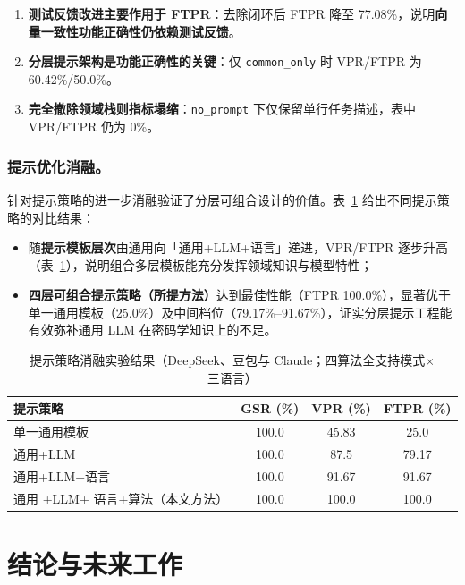 \documentclass[runningheads]{llncs}
\begin{document}
\begin{enumerate}[leftmargin=1.2em, labelsep=0.4em]
  \item \textbf{测试反馈改进主要作用于 FTPR}：去除闭环后 FTPR 降至 77.08\%，说明\textbf{向量一致性功能正确性仍依赖测试反馈}。
  \item \textbf{分层提示架构是功能正确性的关键}：仅 \texttt{common\_only} 时 VPR/FTPR 为 60.42\%/50.0\%。
  \item \textbf{完全撤除领域栈则指标塌缩}：\texttt{no\_prompt} 下仅保留单行任务描述，表中 VPR/FTPR 仍为 0\%。
\end{enumerate}


\subsubsection{提示优化消融。}
针对提示策略的进一步消融验证了分层可组合设计的价值。表~\ref{tab:ablation_prompt} 给出不同提示策略的对比结果：
\begin{itemize}[leftmargin=1.2em, labelsep=0.4em]
  \item 随\textbf{提示模板层次}由通用向「通用+LLM+语言」递进，VPR/FTPR 逐步升高（表~\ref{tab:ablation_prompt}），说明组合多层模板能充分发挥领域知识与模型特性；
  \item \textbf{四层可组合提示策略（所提方法）}达到最佳性能（FTPR 100.0\%），显著优于单一通用模板（25.0\%）及中间档位（79.17\%--91.67\%），证实分层提示工程能有效弥补通用 LLM 在密码学知识上的不足。
\end{itemize}

\begin{table}[H]
  \centering
  \caption{提示策略消融实验结果（DeepSeek、豆包与 Claude；四算法全支持模式$\times$三语言）}
  \label{tab:ablation_prompt}
  \setlength{\tabcolsep}{4pt}
  \begin{tabular}{l c c c}
    \toprule
    提示策略               & GSR (\%) & VPR (\%) & FTPR (\%) \\
    \midrule
    单一通用模板         & 100.0    & 45.83    & 25.0      \\
    通用+LLM              & 100.0    & 87.5     & 79.17     \\
    通用+LLM+语言        & 100.0    & 91.67    & 91.67     \\
    通用 +LLM+ 语言+算法（本文方法） & 100.0 & 100.0 & 100.0 \\
    \bottomrule
  \end{tabular}
\end{table}

\section{结论与未来工作}
\end{document}
